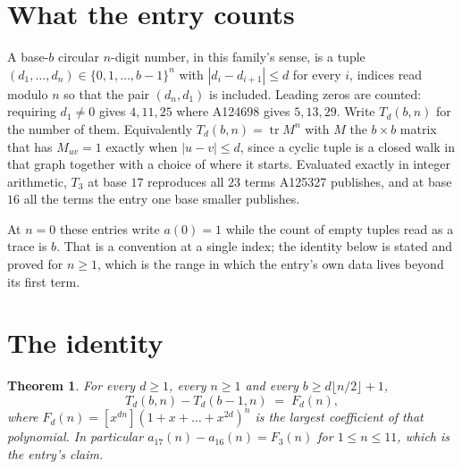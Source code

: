 \documentclass[11pt,a4paper]{article}
\theoremstyle{plain}
\newtheorem{theorem}{Theorem}
\theoremstyle{definition}
\begin{document}
\section{What the entry counts}

A base-$b$ circular $n$-digit number, in this family's sense, is a tuple
$(d_1,\dots,d_n)\in\{0,1,\dots,b-1\}^{n}$ with $|d_i-d_{i+1}|\le d$ for every $i$, indices
read modulo $n$ so that the pair $(d_n,d_1)$ is included. Leading zeros are counted: requiring
$d_1\ne0$ gives $4,11,25$ where A124698 gives $5,13,29$. Write $T_d(b,n)$ for the number of
them. Equivalently $T_d(b,n)=\operatorname{tr}M^{n}$ with $M$ the $b\times b$ matrix that has
$M_{uv}=1$ exactly when $|u-v|\le d$, since a cyclic tuple is a closed walk in that graph
together with a choice of where it starts. Evaluated exactly in integer arithmetic, $T_{3}$
at base $17$ reproduces all $23$ terms A125327 publishes, and at base $16$ all the
terms the entry one base smaller publishes.

At $n=0$ these entries write $a(0)=1$ while the count of empty tuples read as a trace is $b$.
That is a convention at a single index; the identity below is stated and proved for $n\ge1$,
which is the range in which the entry's own data lives beyond its first term.

\section{The identity}

\begin{theorem}
For every $d\ge1$, every $n\ge1$ and every $b\ge d\lfloor n/2\rfloor+1$,
\[
T_d(b,n)-T_d(b-1,n)\;=\;F_d(n),
\]
where $F_d(n)=[x^{dn}](1+x+\dots+x^{2d})^{n}$ is the largest coefficient of that
polynomial. In particular $a_{17}(n)-a_{16}(n)=F_{3}(n)$ for $1\le n\le11$, which
is the entry's claim.
\end{theorem}
\end{document}
